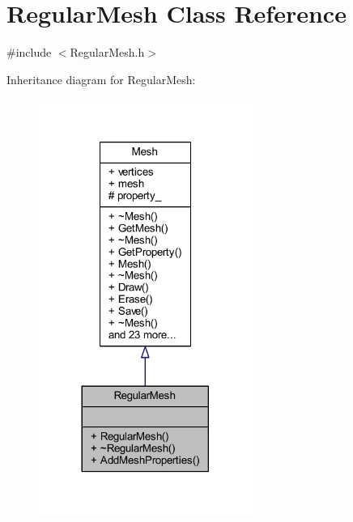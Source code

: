 \hypertarget{class_regular_mesh}{}\section{Regular\+Mesh Class Reference}
\label{class_regular_mesh}


{\ttfamily \#include $<$Regular\+Mesh.\+h$>$}



Inheritance diagram for Regular\+Mesh\+:\nopagebreak
\begin{figure}[H]
\begin{center}
\leavevmode
\includegraphics[width=197pt]{class_regular_mesh__inherit__graph}
\end{center}
\end{figure}


